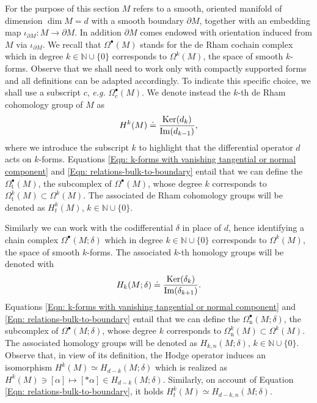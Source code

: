 For the purpose of this section $M$ refers to a smooth, oriented manifold of dimension $\dim M=d$ with a smooth boundary $\partial M$, together with an embedding map $\iota_{\partial M}:M\to\partial M$. In addition $\partial M$ comes endowed with orientation induced from $M$ via $\iota_{\partial M}$. We recall that $\Omega^\bullet(M)$ stands for the de Rham cochain complex which in degree  $k\in\mathbb{N}\cup\{0\}$ corresponds to $\Omega^k(M)$, the space of smooth $k$-forms. Observe that we shall need to work only with compactly supported forms and all definitions can be adapted accordingly. To indicate this specific choice, we shall use a subscript $c$, {\it e.g.} $\Omega^\bullet_c(M)$. We denote instead the $k$-th de Rham cohomology group of $M$ as 
$$H^k(M)\doteq\frac{\operatorname{Ker} (d_k)}{\operatorname{Im} (d_{k-1})},$$
where we introduce the subscript $k$ to highlight that the differential operator $d$ acts on $k$-forms. Equations \eqref{Eqn: k-forms with vanishing tangential or normal component} and \eqref{Eqn: relations-bulk-to-boundary} entail that we can define the $\Omega^\bullet_{\mathrm{t}}(M)$, the subcomplex of $\Omega^\bullet(M)$, whose degree $k$ corresponds to $\Omega^k_{\mathrm{t}}(M)\subset\Omega^k(M)$. The associated de Rham cohomology groups will be denoted as $H^k_t(M)$, $k\in\mathbb{N}\cup\{0\}$.

Similarly we can work with the codifferential $\delta$ in place of $d$, hence identifying a chain complex $\Omega^\bullet(M;\delta)$ which in degree  $k\in\mathbb{N}\cup\{0\}$ corresponds to $\Omega^k(M)$, the space of smooth $k$-forms. The associated $k$-th homology groups will be denoted with 
$$H_k(M;\delta)\doteq\frac{\operatorname{Ker} (\delta_k)}{\operatorname{Im} (\delta_{k+1})}.$$
Equations \eqref{Eqn: k-forms with vanishing tangential or normal component} and \eqref{Eqn: relations-bulk-to-boundary} entail that we can define the $\Omega^\bullet_{\mathrm{n}}(M;\delta)$, the subcomplex of $\Omega^\bullet(M;\delta)$, whose degree $k$ corresponds to $\Omega^k_{\mathrm{n}}(M)\subset\Omega^k(M)$. The associated homology groups will be denoted as $H_{k,n}(M;\delta)$, $k\in\mathbb{N}\cup\{0\}$. Observe that, in view of its definition, the Hodge operator induces an isomorphism $H^k(M)\simeq H_{d-k}(M;\delta)$ which is realized as $H^k(M)\ni[\alpha]\mapsto [\ast\alpha]\in H_{d-k}(M;\delta)$. Similarly, on account of Equation \eqref{Eqn: relations-bulk-to-boundary}, it holds $H^k_t(M)\simeq H_{d-k,n}(M;\delta)$.

